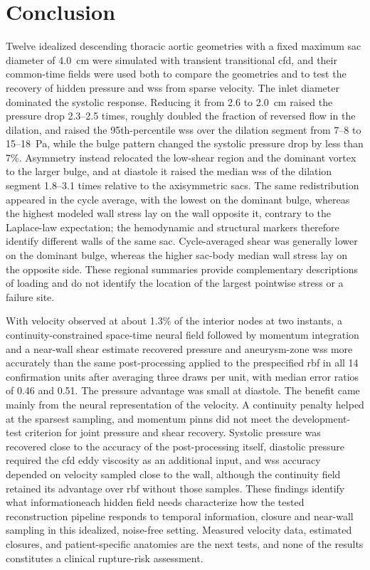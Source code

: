 \documentclass[12pt,a4paper]{article}
\newcommand{\cfdrevision}[1]{#1} %
\newcommand{\CFD}{\ac{cfd}\xspace}
\newcommand{\PINNs}{\acp{pinn}\xspace}
\newcommand{\WSS}{\ac{wss}\xspace}
\newcommand{\TAWSS}{\ac{tawss}\xspace}
\newcommand{\RBF}{\ac{rbf}\xspace}
\theoremstyle{definition}
\numberwithin{equation}{section}
\providecommand{\DIFaddtex}[1]{{\protect\color{blue} \sf #1}} %
\providecommand{\DIFdeltex}[1]{{\protect\color{red} \scriptsize #1}} %
\providecommand{\DIFaddbegin}{} %
\providecommand{\DIFaddend}{} %
\providecommand{\DIFdelbegin}{} %
\providecommand{\DIFdelend}{} %
\providecommand{\DIFadd}[1]{\texorpdfstring{\DIFaddtex{#1}}{#1}} %
\providecommand{\DIFdel}[1]{\texorpdfstring{\DIFdeltex{#1}}{}} %
\newcommand{\DIFscaledelfig}{0.5}
\newlength{\DIFdelgraphicswidth} %
\newlength{\DIFdelgraphicsheight} %
\newcommand{\DIFaddincludegraphics}[2][]{{\color{blue}\fbox{\DIFOincludegraphics[#1]{#2}}}} %
\newcommand{\DIFdelincludegraphics}[2][]{%
\sbox{\DIFdelgraphicsbox}{\DIFOincludegraphics[#1]{#2}}%
\settoboxwidth{\DIFdelgraphicswidth}{\DIFdelgraphicsbox} %
\settoboxtotalheight{\DIFdelgraphicsheight}{\DIFdelgraphicsbox} %
\scalebox{\DIFscaledelfig}{%
\parbox[b]{\DIFdelgraphicswidth}{\usebox{\DIFdelgraphicsbox}\\[-\baselineskip] \rule{\DIFdelgraphicswidth}{0em}}\llap{\resizebox{\DIFdelgraphicswidth}{\DIFdelgraphicsheight}{%
\setlength{\unitlength}{\DIFdelgraphicswidth}%
\begin{picture}(1,1)%
\thicklines\linethickness{2pt} %
{\color[rgb]{1,0,0}\put(0,0){\framebox(1,1){}}}%
{\color[rgb]{1,0,0}\put(0,0){\line( 1,1){1}}}%
{\color[rgb]{1,0,0}\put(0,1){\line(1,-1){1}}}%
\end{picture}%
}\hspace*{3pt}}} %
} %
\DeclareRobustCommand{\DIFaddbegin}{\DIFOaddbegin \let\includegraphics\DIFaddincludegraphics} %
\DeclareRobustCommand{\DIFaddend}{\DIFOaddend \let\includegraphics\DIFOincludegraphics} %
\DeclareRobustCommand{\DIFdelbegin}{\DIFOdelbegin \let\includegraphics\DIFdelincludegraphics} %
\DeclareRobustCommand{\DIFdelend}{\DIFOaddend \let\includegraphics\DIFOincludegraphics} %
\begin{document}
\section{Conclusion}
\label{sec:conclusion}
Twelve idealized descending thoracic aortic geometries with a fixed maximum sac diameter of 4.0~cm were simulated with transient transitional \CFD, and their common-time fields were used both to compare the geometries and to test the recovery of hidden pressure and \WSS from sparse velocity. The inlet diameter dominated the systolic response. Reducing it from 2.6 to 2.0~cm raised the pressure drop 2.3--2.5 times, roughly doubled the fraction of reversed flow in the dilation, and raised the 95th-percentile \WSS over the dilation segment from 7--8 to 15--18~Pa, while the bulge pattern changed the systolic pressure drop by less than 7\%. Asymmetry instead relocated the low-shear region and the dominant vortex to the larger bulge, and at diastole it raised the median \WSS of the dilation segment 1.8--3.1 times relative to the axisymmetric sacs. \DIFdelbegin \DIFdel{The same redistribution appeared in the cycle average, with the lowest }%
\DIFdel{on the dominant bulge, whereas the highest modeled wall stress lay on the wall opposite it, contrary to the Laplace-law expectation; the hemodynamic and structural markers therefore identify different walls of the same sac.
}\DIFdelend \DIFaddbegin \DIFadd{\cfdrevision{Cycle-averaged shear was generally lower on the dominant bulge, whereas the higher sac-body median wall stress lay on the opposite side. These regional summaries provide complementary descriptions of loading and do not identify the location of the largest pointwise stress or a failure site.}
}\DIFaddend 

With velocity observed at about 1.3\% of the interior nodes at two instants, a continuity-constrained space-time neural field followed by momentum integration and a near-wall shear estimate recovered pressure and aneurysm-zone \WSS more accurately than the same post-processing applied to the prespecified \RBF in all 14 confirmation units after averaging three draws per unit, with median error ratios of 0.46 and 0.51. The pressure advantage was small at diastole. The benefit came mainly from the neural representation of the velocity. A continuity penalty helped at the sparsest sampling, and momentum \PINNs did not meet the development-test criterion for joint pressure and shear recovery. Systolic pressure was recovered close to the accuracy of the post-processing itself, diastolic pressure required the \CFD eddy viscosity as an additional input, and \WSS accuracy depended on velocity sampled close to the wall, although the continuity field retained its advantage over \RBF without those samples. These findings \DIFdelbegin \DIFdel{identify what informationeach hidden field needs }\DIFdelend \DIFaddbegin \DIFadd{characterize how the tested reconstruction pipeline responds to temporal information, closure and near-wall sampling }\DIFaddend in this idealized, noise-free setting. Measured velocity data, estimated closures, and patient-specific anatomies are the next tests, and none of the results constitutes a clinical rupture-risk assessment.
\end{document}
